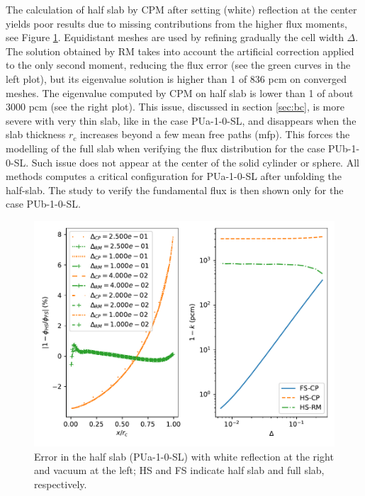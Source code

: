 \documentclass{ictt26}
\begin{document}
The calculation of half slab by CPM after setting (white) reflection at the center yields poor results due to missing contributions from the higher flux moments, see Figure \ref{fig:cpm_hslab_err}. Equidistant meshes are used by refining gradually the cell width $\Delta$. The solution obtained by RM takes into account the artificial correction applied to the only second moment, reducing the flux error (see the green curves in the left plot), but its eigenvalue solution is higher than 1 of 836 pcm on converged meshes. The eigenvalue computed by CPM on half slab is lower than 1 of about 3000 pcm (see the right plot). This issue, discussed in section \ref{sec:bc}, is more severe with very thin slab, like in the case PUa-1-0-SL, and disappears when the slab thickness $r_c$ increases beyond a few mean free paths (mfp). This forces the modelling of the full slab when verifying the flux distribution for the case PUb-1-0-SL. Such issue does not appear at the center of the solid cylinder or sphere. %
All methods computes a critical configuration for PUa-1-0-SL after unfolding the half-slab. The study to verify the fundamental flux is then shown only for the case PUb-1-0-SL.

\begin{figure}[htbp]
\centering
\includegraphics[width=.8\linewidth]{cpm_hslab_err.pdf}
\caption{Error in the half slab (PUa-1-0-SL) with white reflection at the right and vacuum at the left; HS and FS indicate half slab and full slab, respectively.}
\label{fig:cpm_hslab_err}
\end{figure}
\end{document}
